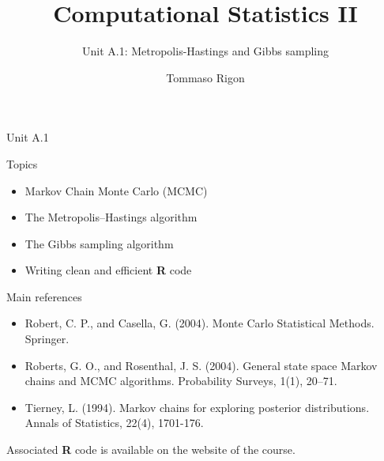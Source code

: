 \documentclass[
  9pt,
  ignorenonframetext,
]{beamer}
\title{Computational Statistics II}
\subtitle{Unit A.1: Metropolis-Hastings and Gibbs sampling}
\author{Tommaso Rigon}
\date{}
\institute{Unimib}
\providecommand{\tightlist}{%
  \setlength{\itemsep}{0pt}\setlength{\parskip}{0pt}}\usepackage{longtable,booktabs,array}
\begin{document}
\frame{\titlepage}
\ifdefined\Shaded\renewenvironment{Shaded}{\begin{tcolorbox}[frame hidden, sharp corners, boxrule=0pt, interior hidden, borderline west={3pt}{0pt}{shadecolor}, enhanced, breakable]}{\end{tcolorbox}}\fi

\begin{frame}{Unit A.1}
\protect\hypertarget{unit-a.1}{}
\begin{block}{Topics}
\protect\hypertarget{topics}{}
\begin{itemize}
\tightlist
\item
  Markov Chain Monte Carlo (MCMC)
\item
  The Metropolis--Hastings algorithm
\item
  The Gibbs sampling algorithm
\item
  Writing clean and efficient \textbf{R} code
\end{itemize}
\end{block}

\begin{block}{Main references}
\protect\hypertarget{main-references}{}
\begin{itemize}
\tightlist
\item
  Robert, C. P., and Casella, G. (2004). Monte Carlo Statistical
  Methods. Springer.
\item
  Roberts, G. O., and Rosenthal, J. S. (2004). General state space
  Markov chains and MCMC algorithms. Probability Surveys, 1(1), 20--71.
\item
  Tierney, L. (1994). Markov chains for exploring posterior
  distributions. Annals of Statistics, 22(4), 1701-176.
\end{itemize}

Associated \textbf{R} code is available on the website of the course.
\end{block}
\end{frame}
\end{document}
